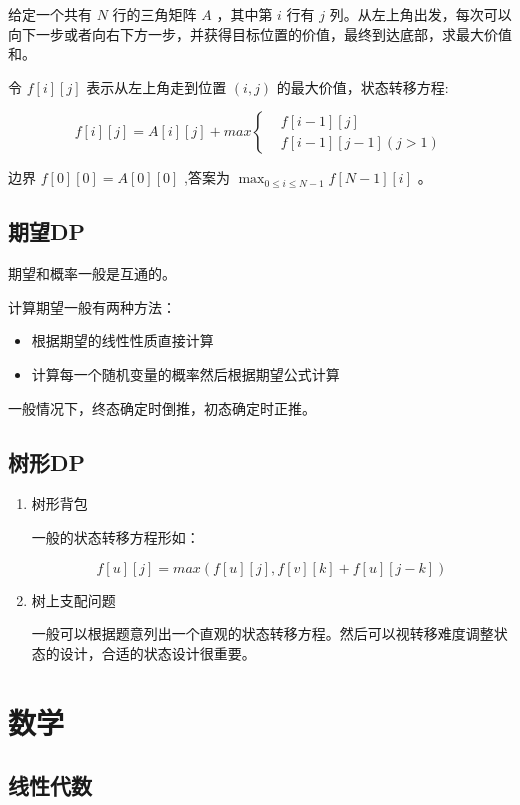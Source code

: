\documentclass[11pt]{article}
\begin{document}
给定一个共有 $N$ 行的三角矩阵 $A$ ，其中第 $i$ 行有 $j$ 列。从左上角出发，每次可以向下一步或者向右下方一步，并获得目标位置的价值，最终到达底部，求最大价值和。

令 $f[i][j]$ 表示从左上角走到位置 $(i,j)$ 的最大价值，状态转移方程:

$$
f[i][j]=A[i][j]+max\left\{\begin{aligned}
&f[i-1][j]\\
&f[i-1][j-1] (j>1)
\end{aligned}\right.
$$

边界 $f[0][0]=A[0][0]$ ,答案为 $\max_{0 \leq i \leq N-1} f[N-1][i]$ 。

\subsection{期望DP}
\label{sec-2-4}

期望和概率一般是互通的。

计算期望一般有两种方法：

\begin{itemize}
\item 根据期望的线性性质直接计算
\item 计算每一个随机变量的概率然后根据期望公式计算
\end{itemize}

一般情况下，终态确定时倒推，初态确定时正推。
\subsection{树形DP}
\label{sec-2-5}

\begin{enumerate}
\item 树形背包
\label{sec-2-5-0-1}

一般的状态转移方程形如：

$$
f[u][j] = max(f[u][j], f[v][k] + f[u][j - k])
$$

\item 树上支配问题
\label{sec-2-5-0-2}

一般可以根据题意列出一个直观的状态转移方程。然后可以视转移难度调整状态的设计，合适的状态设计很重要。
\end{enumerate}
\section{数学}
\label{sec-3}
\subsection{线性代数}
\label{sec-3-1}
\end{document}
